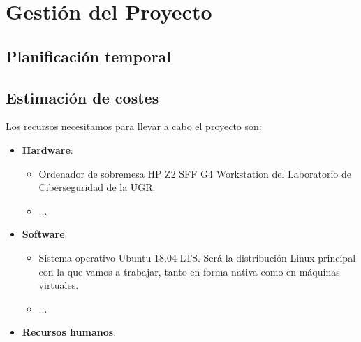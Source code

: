 \chapter{Gestión del Proyecto}\label{cap:planif}

\section{Planificación temporal}

\section{Estimación de costes}

Los recursos necesitamos para llevar a cabo el proyecto son:

\begin{itemize}
    \item \textbf{Hardware}:

          \begin{itemize}
              \item Ordenador de sobremesa HP Z2 SFF G4 Workstation del Laboratorio de Ciberseguridad de la UGR.

              \item ...
          \end{itemize}

    \item \textbf{Software}:

          \begin{itemize}
              \item Sistema operativo Ubuntu 18.04 LTS. Será la distribución Linux principal con la que vamos a trabajar, tanto en forma nativa como en máquinas virtuales.

              \item ...

          \end{itemize}

    \item \textbf{Recursos humanos}.
\end{itemize}